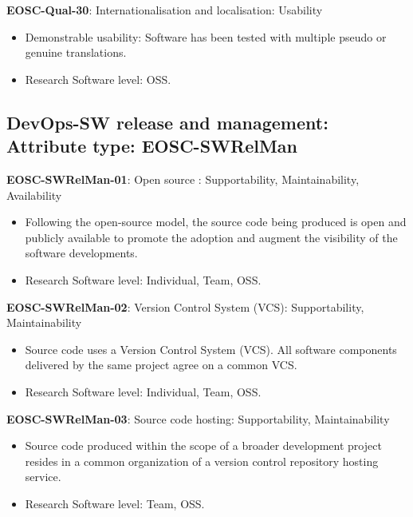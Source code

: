 \textbf{EOSC-Qual-30}: Internationalisation and localisation: Usability

\begin{itemize}
    \item Demonstrable usability: Software has been tested with multiple pseudo or genuine translations.~\cite{shepherdson_cessda_2019}
    \item Research Software level: OSS.
\end{itemize}

\subsection{DevOps-SW release and management: Attribute type: EOSC-SWRelMan}

\textbf{EOSC-SWRelMan-01}: Open source : Supportability, Maintainability, Availability

\begin{itemize}
    \item Following the open-source model, the source code being produced is open and publicly available to promote the adoption and augment the visibility of the software developments.~\cite{orviz_set_2017,raymond_software_2013}
    \item Research Software level: Individual, Team, OSS.
\end{itemize}

\textbf{EOSC-SWRelMan-02}: Version Control System (VCS): Supportability, Maintainability

\begin{itemize}
    \item Source code uses a Version Control System (VCS). All software components delivered by the same project agree on a common VCS.~\cite{orviz_set_2017}
    \item Research Software level: Individual, Team, OSS.
\end{itemize}

\textbf{EOSC-SWRelMan-03}: Source code hosting: Supportability, Maintainability

\begin{itemize}
    \item Source code produced within the scope of a broader development project resides in a common organization of a version control repository hosting service.~\cite{orviz_set_2017}
    \item Research Software level: Team, OSS.
\end{itemize}

